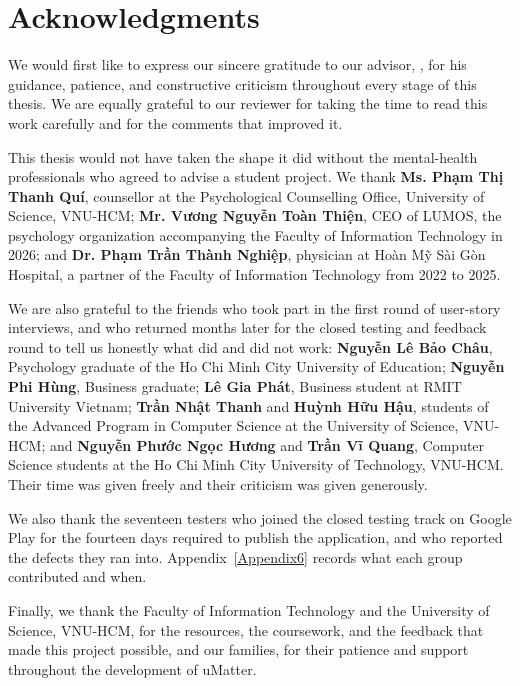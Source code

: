 \chapter*{Acknowledgments}
\label{thanks}

We would first like to express our sincere gratitude to our advisor,
\tenGVHD, for his guidance, patience, and constructive criticism throughout
every stage of this thesis. We are equally grateful to our reviewer for taking
the time to read this work carefully and for the comments that improved it.

This thesis would not have taken the shape it did without the mental-health
professionals who agreed to advise a student project. We thank
\textbf{Ms. Phạm Thị Thanh Quí}, counsellor at the Psychological Counselling
Office, University of Science, VNU-HCM; \textbf{Mr. Vương Nguyễn Toàn Thiện},
CEO of LUMOS, the psychology organization accompanying the Faculty of
Information Technology in 2026; and \textbf{Dr. Phạm Trần Thành Nghiệp},
physician at Hoàn Mỹ Sài Gòn Hospital, a partner of the Faculty of Information
Technology from 2022 to 2025.

We are also grateful to the friends who took part in the first round of
user-story interviews, and who returned months later for the closed testing and feedback
round to tell us honestly what did and did not work:
\textbf{Nguyễn Lê Bảo Châu}, Psychology graduate of the Ho Chi Minh City
University of Education; \textbf{Nguyễn Phi Hùng}, Business graduate;
\textbf{Lê Gia Phát}, Business student at RMIT University Vietnam;
\textbf{Trần Nhật Thanh} and \textbf{Huỳnh Hữu Hậu}, students of the Advanced
Program in Computer Science at the University of Science, VNU-HCM; and
\textbf{Nguyễn Phước Ngọc Hương} and \textbf{Trần Vĩ Quang}, Computer Science
students at the Ho Chi Minh City University of Technology, VNU-HCM. Their time
was given freely and their criticism was given generously.

We also thank the seventeen testers who joined the
closed testing track on Google Play for the fourteen days required to publish
the application, and who reported the defects they ran into.
Appendix~\ref{Appendix6} records what each group contributed and when.

Finally, we thank the Faculty of Information Technology and the University of
Science, VNU-HCM, for the resources, the coursework, and the feedback that made
this project possible, and our families, for their patience and support
throughout the development of uMatter.
